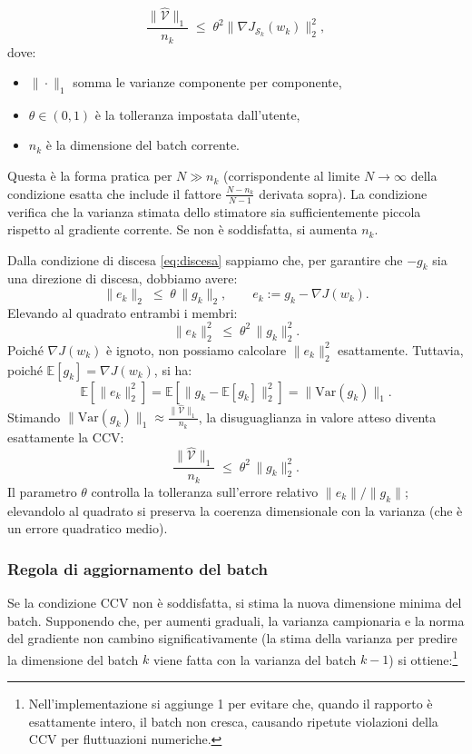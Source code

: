 \documentclass[a4paper,12pt]{article}
\numberwithin{equation}{section}
\numberwithin{figure}{section}
\numberwithin{table}{section}
\begin{document}
\begin{thmbox}
  \[
    \frac{\|\widehat{\mathcal{V}}\|_1}{n_k} \;\leq\; \theta^2 \|\nabla J_{\mathcal{S}_k}(w_k)\|_2^2,
  \]
  dove:
  \begin{itemize}
    \item $\|\cdot\|_1$ somma le varianze componente per componente,
    \item $\theta \in (0,1)$ \`e la tolleranza impostata dall'utente,
    \item $n_k$ \`e la dimensione del batch corrente.
  \end{itemize}
  Questa \`e la forma pratica per $N \gg n_k$ (corrispondente al limite $N\to\infty$ della condizione esatta che include il fattore $\frac{N-n_k}{N-1}$ derivata sopra). La condizione verifica che la varianza stimata dello stimatore sia sufficientemente piccola rispetto al gradiente corrente. Se non \`e soddisfatta, si aumenta $n_k$.
\end{thmbox}
\begin{notebox}

Dalla condizione di discesa \eqref{eq:discesa} sappiamo che, per garantire che $-g_k$ sia una direzione di discesa, dobbiamo avere:
\[
\|e_k\|_2 \;\le\; \theta\, \|g_k\|_2, \qquad e_k := g_k - \nabla J(w_k).
\]
Elevando al quadrato entrambi i membri:
\[
\|e_k\|_2^2 \;\le\; \theta^2\, \|g_k\|_2^2.
\]
Poiché $\nabla J(w_k)$ è ignoto, non possiamo calcolare $\|e_k\|_2^2$ esattamente. Tuttavia, poiché $\mathbb{E}[g_k] = \nabla J(w_k)$, si ha:
\[
\mathbb{E}\left[\|e_k\|_2^2\right] = \mathbb{E}\left[\|g_k - \mathbb{E}[g_k]\|_2^2\right] = \|\mathrm{Var}(g_k)\|_1.
\]
Stimando $\|\mathrm{Var}(g_k)\|_1 \approx \frac{\|\widehat{\mathcal{V}}\|_1}{n_k}$, la disuguaglianza in valore atteso diventa esattamente la CCV:
\[
\frac{\|\widehat{\mathcal{V}}\|_1}{n_k} \;\le\; \theta^2\, \|g_k\|_2^2.
\]
Il parametro $\theta$ controlla la tolleranza sull'errore relativo $\|e_k\|/\|g_k\|$; elevandolo al quadrato si preserva la coerenza dimensionale con la varianza (che è un errore quadratico medio).
\end{notebox}

\subsubsection{Regola di aggiornamento del batch}

Se la condizione CCV non \`e soddisfatta, si stima la nuova dimensione minima del batch. Supponendo che, per aumenti graduali, la varianza campionaria e la norma del gradiente non cambino significativamente (la stima della varianza per predire la dimensione del batch $k$ viene fatta con la varianza del batch $k-1$) si ottiene:\footnote{Nell'implementazione si aggiunge 1 per evitare che, quando il rapporto \`e esattamente intero, il batch non cresca, causando ripetute violazioni della CCV per fluttuazioni numeriche.}
\end{document}
